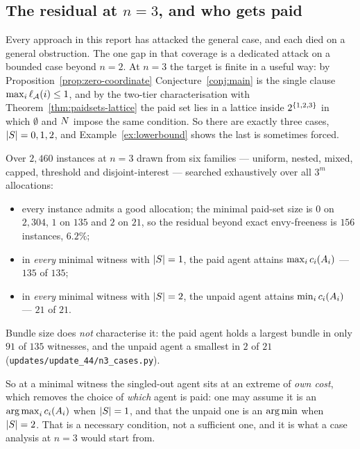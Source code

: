 \subsection{The residual at \texorpdfstring{$n = 3$}{n=3}, and who gets paid}
\label{sec:n3-residual}

Every approach in this report has attacked the general case, and each died on a
general obstruction. The one gap in that coverage is a dedicated attack on a
bounded case beyond $n = 2$. At $n = 3$ the target is finite in a useful way: by
Proposition~\ref{prop:zero-coordinate} Conjecture~\ref{conj:main} is the single
clause $\max_i \ell_{\mathcal{A}}(i) \le 1$, and by the two-tier characterisation with
Theorem~\ref{thm:paidsets-lattice} the paid set lies in a lattice inside
$2^{\left\{1,2,3\right\}}$ in which $\emptyset$ and $N$ impose the same condition. So
there are exactly three cases, $\left\lvert S\right\rvert = 0, 1, 2$, and
Example~\ref{ex:lowerbound} shows the last is sometimes forced.

\begin{observation}
\label{obs:n3-residual}
Over $2{,}460$ instances at $n = 3$ drawn from six families --- uniform, nested,
mixed, capped, threshold and disjoint-interest --- searched exhaustively over all
$3^m$ allocations:
\begin{itemize}
  \item every instance admits a good allocation; the minimal paid-set size is
    $0$ on $2{,}304$, $1$ on $135$ and $2$ on $21$, so the residual beyond exact
    envy-freeness is $156$ instances, $6.2\%$;
  \item in \emph{every} minimal witness with $\left\lvert S\right\rvert = 1$, the paid agent attains
    $\max_i c_i(A_{i})$ --- $135$ of $135$;
  \item in \emph{every} minimal witness with $\left\lvert S\right\rvert = 2$, the unpaid agent
    attains $\min_i c_i(A_{i})$ --- $21$ of $21$.
\end{itemize}
Bundle size does \emph{not} characterise it: the paid agent holds a largest
bundle in only $91$ of $135$ witnesses, and the unpaid agent a smallest in $2$ of
$21$ (\texttt{updates/update\_44/n3\_cases.py}).
\end{observation}

So at a minimal witness the singled-out agent sits at an extreme of \emph{own
cost}, which removes the choice of \emph{which} agent is paid: one may assume it
is an $\operatorname*{arg\,max}_i c_i(A_{i})$ when $\left\lvert S\right\rvert = 1$, and that the unpaid one
is an $\operatorname*{arg\,min}$ when $\left\lvert S\right\rvert = 2$. That is a necessary condition, not a
sufficient one, and it is what a case analysis at $n = 3$ would start from.

